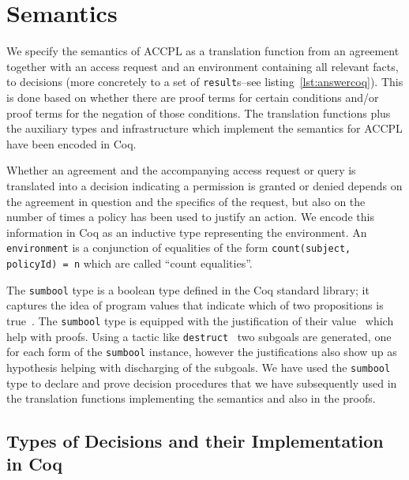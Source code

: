 \documentclass[runningheads,a4paper]{llncs}
\newcommand{\syn}{\texttt}
\begin{document}
\section{Semantics}
We specify the semantics of \ac{ACCPL} as a translation function from an agreement together with an access request and an environment containing all relevant facts, to decisions (more concretely to a set of \syn{result}s--see listing~\ref{lst:answercoq}). This is done based on whether there are proof terms for certain conditions and/or proof terms for the negation of those conditions. The translation functions plus the auxiliary types and infrastructure which implement the semantics for \ac{ACCPL} have been encoded in Coq.

Whether an agreement and the accompanying access request or query is translated into a decision indicating a permission is granted or denied depends on the agreement in question and the specifics of the request, but also on the number of times a policy has been used to justify an action. We encode this information in Coq as an inductive type representing the environment. An \syn{environment} is a conjunction of equalities of the form \syn{count(subject, policyId) = n} which are called ``count equalities''.

The \syn{sumbool} type is a boolean type defined in the Coq standard library; it captures the idea of program values that indicate which of two propositions is true~\cite{chlipalacpdt2011}. The \syn{sumbool} type is equipped with the justification of their value~\cite{Coq:manual} which help with proofs. Using a tactic like \syn{destruct}~\cite{Coq:manual} two subgoals are generated, one for each form of the \syn{sumbool} instance, however the justifications also show up as hypothesis helping with discharging of the subgoals. We have used the \syn{sumbool} type to declare and prove decision procedures that we have subsequently used in the translation functions implementing the semantics and also in the proofs.

\subsection{Types of Decisions and their Implementation in Coq}\label{sec:answerandresulttypes}
\end{document}
